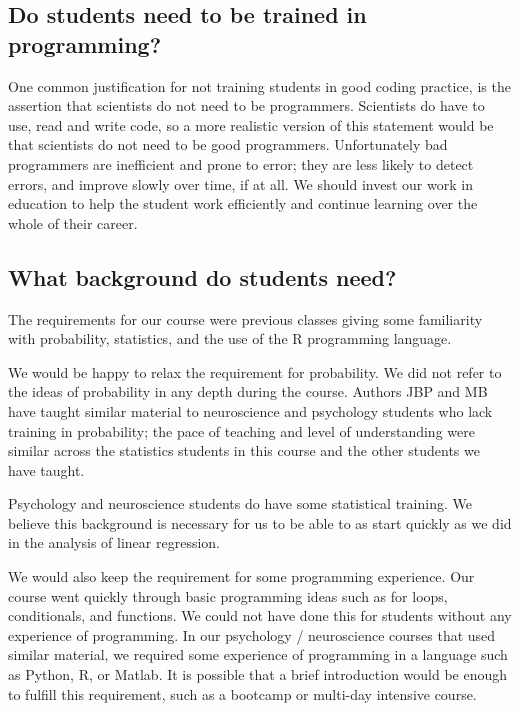 
\subsection{Do students need to be trained in programming?}

One common justification for not training students in good coding practice, is
the assertion that scientists do not need to be programmers.  Scientists do
have to use, read and write code, so a more realistic version of this
statement would be that scientists do not need to be good programmers.
Unfortunately bad programmers are inefficient and prone to error; they are
less likely to detect errors, and improve slowly over time, if at all.  We
should invest our work in education to help the student work efficiently and
continue learning over the whole of their career.

\subsection{What background do students need?}

The requirements for our course were previous classes giving some familiarity
with probability, statistics, and the use of the R programming language.

We would be happy to relax the requirement for probability.  We did not refer
to the ideas of probability in any depth during the course.  Authors JBP and
MB have taught similar material to neuroscience and psychology students who
lack training in probability; the pace of teaching and level of understanding
were similar across the statistics students in this course and the other
students we have taught.

Psychology and neuroscience students do have some statistical training.  We
believe this background is necessary for us to be able to as start quickly as
we did in the analysis of linear regression.

We would also keep the requirement for some programming experience.  Our
course went quickly through basic programming ideas such as for loops,
conditionals, and functions.  We could not have done this for students without
any experience of programming.  In our psychology / neuroscience courses that
used similar material, we required some experience of programming in a
language such as Python, R, or Matlab.  It is possible that a brief
introduction would be enough to fulfill this requirement, such as a bootcamp
or multi-day intensive course.

